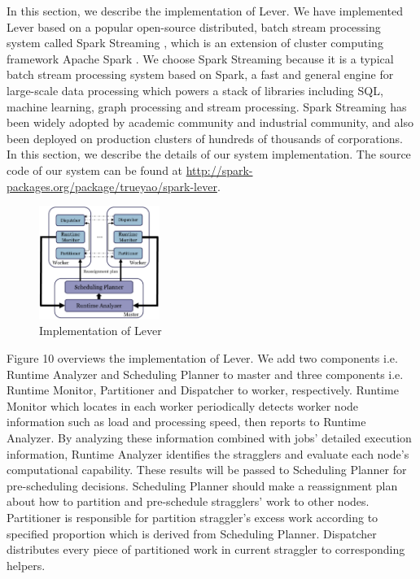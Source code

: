 \documentclass[10pt,conference,compsocconf,letterpaper]{IEEEtran}
\begin{document}
  In this section, we describe the implementation of Lever. We have implemented Lever based on a popular open-source distributed, batch stream processing system called Spark Streaming \cite{spark-streaming}, which is an extension of cluster computing framework Apache Spark \cite{spark}. We choose Spark Streaming because it is a typical batch stream processing system based on Spark, a fast and general engine for large-scale data processing which powers a stack of libraries including SQL, machine learning, graph processing and stream processing. Spark Streaming has been widely adopted by academic community and industrial community, and also been deployed on production clusters of hundreds of thousands of corporations. In this section, we describe the details of our system implementation. The source code of our system can be found at \url{http://spark-packages.org/package/trueyao/spark-lever}.
  \begin{figure}[htbp]
    \centering
    \includegraphics[width=0.35\textwidth]{Figure7}
    \caption{Implementation of Lever}
    \label{Fig. 10:}
  \end{figure}

  Figure 10 overviews the implementation of Lever. We add two components i.e. Runtime Analyzer and Scheduling Planner to master and three components i.e. Runtime Monitor, Partitioner and Dispatcher to worker, respectively. Runtime Monitor which locates in each worker periodically detects worker node information such as load and processing speed, then reports to Runtime Analyzer. By analyzing these information combined with jobs' detailed execution information, Runtime Analyzer identifies the stragglers and evaluate each node's computational capability. These results will be passed to Scheduling Planner for pre-scheduling decisions. Scheduling Planner should make a reassignment plan about how to partition and pre-schedule stragglers' work to other nodes. Partitioner is responsible for partition straggler's excess work according to specified proportion which is derived from Scheduling Planner. Dispatcher distributes every piece of partitioned work in current straggler to corresponding helpers.
\end{document}
